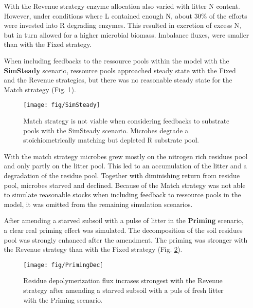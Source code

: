 With the Revenue strategy enzyme allocation also varied with litter N content.
However, under conditions where L contained enough N, about 30\% of the efforts
were invested into R degrading enzymes. This resulted in excretion of
excess N, but in turn allowed for a higher microbial biomass. Imbalance fluxes,
were smaller than with the Fixed strategy.

When including feedbacks to the ressource pools within the model with the
\textbf{SimSteady} scenario, ressource pools approached steady state with the
Fixed and the Revenue strategies, but there was no reasonable steady state for
the Match strategy (Fig. \ref{fig:SimSteady}).

\begin{figure}[t]
\vspace*{2mm}
\begin{center} 
\texttt{[image: fig/SimSteady]} 
\end{center}
\caption{Match strategy is not viable when considering feedbacks to
substrate pools with the SimSteady scenario. Microbes degrade a
stoichiometrically matching but depleted R substrate pool.
\label{fig:SimSteady}} 
\end{figure}

With the match strategy microbes grew mostly on the
nitrogen rich residues pool and only partly on the litter pool. This led to an
accumulation of the litter and a degradation of the residue pool. Together with
diminishing return from residue pool, microbes starved and declined.
Because of the Match strategy was not able to simulate reasonable
stocks when including feedback to ressource pools in the model, it was omitted
from the remaining simulation scenarios.

After amending a starved subsoil with a pulse of litter in the
\textbf{Priming} scenario, a clear real priming effect was simulated. The
decomposition of the soil residues pool was strongly enhanced after the
amendment. The priming was stronger with the Revenue strategy than with the
Fixed strategy (Fig. \ref{fig:PrimingDec}). 

\begin{figure}[t]
\vspace*{2mm}
\begin{center}
\texttt{[image: fig/PrimingDec]}
\end{center}
\caption{Residue depolymerization flux incrases strongest with the Revenue
strategy after amending a starved subsoil with a puls of fresh litter with the
Priming scenario.
\label{fig:PrimingDec}}
\end{figure}

